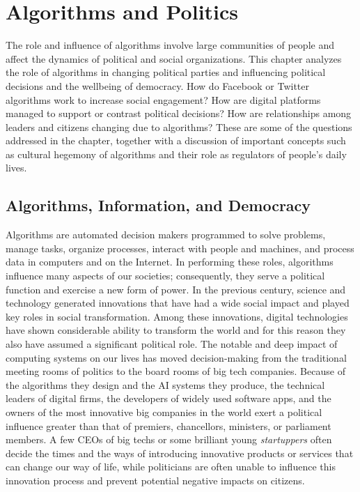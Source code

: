 




%


\setcounter{chapter}{7}

\chapter{\label{chap:8}Algorithms and Politics}


\noindent The role and influence of algorithms involve large communities of people and affect the dynamics of political and social organizations. This chapter analyzes the role of algorithms in changing political parties and influencing political decisions and the wellbeing of democracy. How do Facebook or Twitter algorithms work to increase social engagement? How are digital platforms managed to support or contrast political decisions? How are relationships among leaders and citizens changing due to algorithms? These are some of the questions addressed in the chapter, together with a discussion of important concepts such as cultural hegemony of algorithms and their role as regulators of people's daily lives.

\section{\label{sec:8.1}Algorithms, Information, and Democracy}

Algorithms are automated decision makers programmed to solve problems, manage tasks, organize processes, interact with people and machines, and process data in computers and on the Internet. In performing these roles, algorithms influence many aspects of our societies; consequently, they serve a political function and exercise a new form of power. In the previous century, science and technology generated innovations that have had a wide social impact and played key roles in social transformation. Among these innovations, digital technologies have shown considerable ability to transform the world and for this reason they also have assumed a significant political role. The notable and deep impact of computing systems on our lives has moved decision-making from the traditional meeting rooms of politics to the board rooms of big tech companies. Because of the algorithms they design and the AI systems they produce, the technical leaders of digital firms, the developers of widely used software apps, and the owners of the most innovative big companies in the world exert a political influence greater than that of premiers, chancellors, ministers, or parliament members. A few CEOs of big techs or some brilliant young \textit{startuppers} often decide the times and the ways of introducing innovative products or services that can change our way of life, while politicians are often unable to influence this innovation process and prevent potential negative impacts on citizens.

